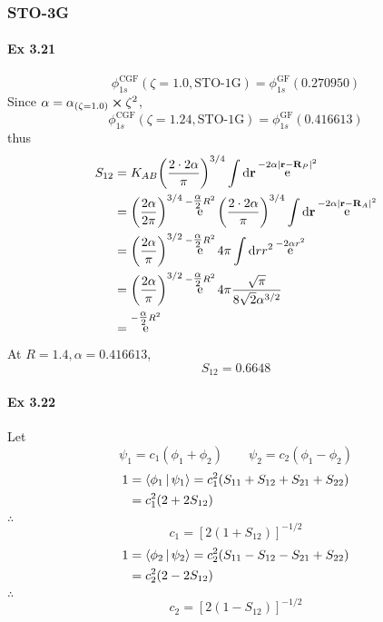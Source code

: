\documentclass[a4paper]{article}
\DeclareMathOperator{\e}{\mathrm{e}}
\newcommand{\ex}[1]{\paragraph{Ex #1}}
\numberwithin{equation}{subsection}
\begin{document}
\subsubsection{STO-3G }
\ex{3.21}
\begin{equation}\label{key}
\phi_{1s}^{\text{CGF}}(\zeta=1.0, \text{STO-1G}) = \phi_{1s}^{\text{GF}}(\num{0.270950})
\end{equation}
Since $ \alpha = \alpha_{(\zeta=1.0)}\cross \zeta^2 $,
\begin{equation}\label{key}
\phi_{1s}^{\text{CGF}}(\zeta=1.24, \text{STO-1G}) = \phi_{1s}^{\text{GF}}(\num{0.416613})
\end{equation}
thus
\begin{align}
S_{12} &= K_{AB} \qty(\dfrac{2\cdot 2\alpha}{\pi})^{3/4} \int \dd\vb{r} \e^{-2\alpha\abs{\vb{r}-\vb{R}_P}^2} \notag\\
&= \qty(\dfrac{2\alpha}{2\pi})^{3/4} \e^{-\tfrac{\alpha}{2}R^2} \qty(\dfrac{2\cdot 2\alpha}{\pi})^{3/4} \int \dd\vb{r} \e^{-2\alpha\abs{\vb{r}-\vb{R}_A}^2} \notag\\
&= \qty(\dfrac{2\alpha}{\pi})^{3/2} \e^{-\tfrac{\alpha}{2}R^2} 4\pi \int \dd r r^2 \e^{-2\alpha r^2} \notag\\
&= \qty(\dfrac{2\alpha}{\pi})^{3/2} \e^{-\tfrac{\alpha}{2}R^2} 4\pi \dfrac{\sqrt{\pi}}{8\sqrt{2} \alpha^{3/2}} \notag\\
&= \e^{-\tfrac{\alpha}{2}R^2}  
\end{align}
At $ R = 1.4, \alpha = \num{0.416613} $,
\begin{equation}\label{key}
S_{12} = \num{0.6648}
\end{equation}

\ex{3.22}
Let 
\begin{equation}\label{key}
\psi_1 = c_1 (\phi_1 + \phi_2) \qquad \psi_2 = c_2 (\phi_1 - \phi_2)
\end{equation}
\begin{align}
1 &= \Braket{\phi_1|\psi_1} = c_1^2 (S_{11} + S_{12} + S_{21} + S_{22}) \notag\\
&= c_1^2 (2 + 2S_{12})
\end{align}
$ \therefore $
\begin{equation}\label{key}
c_1 = [2(1 + S_{12})]^{-1/2}
\end{equation}
\begin{align}
1 &= \Braket{\phi_2|\psi_2} = c_2^2 (S_{11} - S_{12} - S_{21} + S_{22}) \notag\\
&= c_2^2 (2 - 2S_{12})
\end{align}
$ \therefore $
\begin{equation}\label{key}
c_2 = [2(1 - S_{12})]^{-1/2}
\end{equation}
\end{document}
